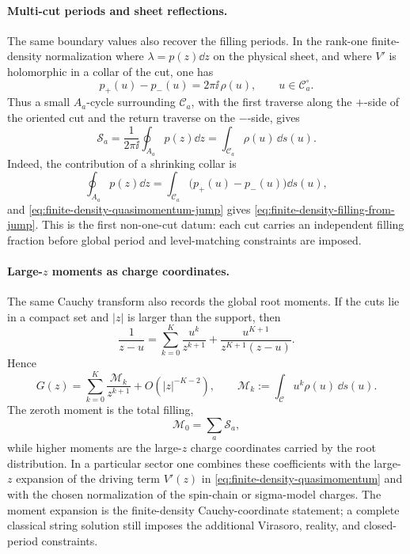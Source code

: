 \paragraph{Multi-cut periods and sheet reflections.}
The same boundary values also recover the filling periods.  In the rank-one
finite-density normalization where \(\lambda=p(z)\dd z\) on the physical
sheet, and where \(V'\) is holomorphic in a collar of the cut, one has
\begin{equation}
  p_+(u)-p_-(u)=2\pi\ii\,\rho(u),
  \qquad u\in\mathcal C_a^\circ .
  \label{eq:finite-density-quasimomentum-jump}
\end{equation}
Thus a small \(A_a\)-cycle surrounding \(\mathcal C_a\), with the first
traverse along the \(+\)-side of the oriented cut and the return traverse on
the \(-\)-side, gives
\begin{equation}
  \mathcal S_a
  =
  \frac1{2\pi\ii}\oint_{A_a}p(z)\dd z
  =
  \int_{\mathcal C_a}\rho(u)\,\dd s(u).
  \label{eq:finite-density-filling-from-jump}
\end{equation}
Indeed, the contribution of a shrinking collar is
\[
  \oint_{A_a}p(z)\dd z
  =
  \int_{\mathcal C_a}\bigl(p_+(u)-p_-(u)\bigr)\dd s(u),
\]
and \eqref{eq:finite-density-quasimomentum-jump} gives
\eqref{eq:finite-density-filling-from-jump}.  This is the first
non-one-cut datum: each cut carries an independent filling fraction before
global period and level-matching constraints are imposed.

\paragraph{Large-\(z\) moments as charge coordinates.}
The same Cauchy transform also records the global root moments.  If the cuts
lie in a compact set and \(|z|\) is larger than the support, then
\[
  \frac1{z-u}
  =
  \sum_{k=0}^{K}\frac{u^k}{z^{k+1}}
  +
  \frac{u^{K+1}}{z^{K+1}(z-u)} .
\]
Hence
\begin{equation}
  G(z)
  =
  \sum_{k=0}^{K}\frac{\mathcal M_k}{z^{k+1}}
  +
  O(|z|^{-K-2}),
  \qquad
  \mathcal M_k
  :=
  \int_{\mathcal C}u^k\rho(u)\,\dd s(u).
  \label{eq:finite-density-large-z-moments}
\end{equation}
The zeroth moment is the total filling,
\[
  \mathcal M_0=\sum_a\mathcal S_a,
\]
while higher moments are the large-\(z\) charge coordinates carried by the
root distribution.  In a particular sector one combines these coefficients
with the large-\(z\) expansion of the driving term \(V'(z)\) in
\eqref{eq:finite-density-quasimomentum} and with the chosen normalization of
the spin-chain or sigma-model charges.  The moment expansion is the
finite-density Cauchy-coordinate statement; a complete classical string
solution still imposes the additional Virasoro, reality, and closed-period
constraints.

